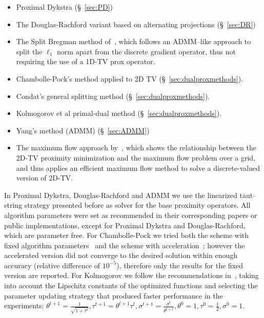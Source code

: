 \documentclass[twoside,11pt]{article}
\newcommand{\half}{\tfrac{1}{2}}
\numberwithin{equation}{section}
\numberwithin{theorem}{section}
\begin{document}
\begin{itemize}
  \setlength{\itemsep}{0pt}
 \item Proximal Dykstra (§~\ref{sec:PD})
 \item The Douglas-Rachford variant based on alternating projections (§~\ref{sec:DR})
 \item The Split Bregman method of~\citet{splitbreg}, which follows an ADMM--like approach to split the $\ell_1$ norm apart from the discrete gradient operator, thus not requiring the use of a 1D-TV prox operator.
 \item Chambolle-Pock's method applied to 2D TV (§~\ref{sec:dualproxmethods}).
 \item Condat's general splitting method (§~\ref{sec:dualproxmethods}).
 \item Kolmogorov et al primal-dual method (§~\ref{sec:dualproxmethods}).
 \item Yang's method (ADMM) (§~\ref{sec:ADMM})
 \item The maximum flow approach by~\citet{goldfarb2009parametric}, which shows the relationship between the 2D-TV proximity minimization and the maximum flow problem over a grid, and thus applies an efficient maximum flow method to solve a discrete-valued version of 2D-TV.
\end{itemize}
In Proximal Dykstra, Douglas-Rachford and ADMM we use the linearized taut--string strategy presented before as solver for the base proximity operators. All algorithm parameters were set as recommended in their corresponding papers or public implementations, except for Proximal Dykstra and Douglas-Rachford, which are parameter free. For Chambolle-Pock we tried both the scheme with fixed algorithm parameters~\citep[Algorithm 1]{chambollePock} and the scheme with acceleration~\citep[Algorithm 2]{chambollePock}; however the accelerated version did not converge to the desired solution within enough accuracy (relative difference of $10^{-5}$), therefore only the results for the fixed version are reported. For Kolmogorov we follow the recommendations in~\citet{ChambolleErgodic14}, taking into account the Lipschitz constants of the optimized functions and selecting the parameter updating strategy that produced faster performance in the experiments: $\theta^{t+1} = \frac{1}{\sqrt{1 + \tau^t}}, \tau^{t+1} = \theta^{t+1} \tau^t, \sigma^{t+1} = \frac{\sigma^t}{\theta^{t+1}}, \theta^0 = 1, \tau^0 = \half, \sigma^0 = 1$.
\end{document}
